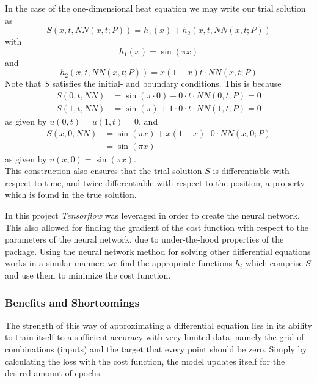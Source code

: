 \documentclass[aps,reprint,superscriptaddress,nofootinbib]{revtex4-2}
\begin{document}
In the case of the one-dimensional heat equation we may write our trial solution as
\begin{equation*}
    S(x, t, NN(x, t; P)) = h_1(x) + h_2(x, t, NN(x, t; P))
\end{equation*}
with
\begin{equation*}
    h_1(x) = \sin(\pi x)
\end{equation*}
and
\begin{equation*}
    h_2(x, t, NN(x, t; P)) = x(1-x)t \cdot NN(x, t; P)
\end{equation*}
Note that $S$ satisfies the initial- and boundary conditions. This is because
\begin{align*}
    S(0, t, NN) &= \sin(\pi \cdot 0) + 0 \cdot t\cdot NN(0, t; P) = 0 \\
    S(1, t, NN) &= \sin(\pi) + 1\cdot 0 \cdot t \cdot NN(1, t; P) = 0
\end{align*}
as given by $u(0, t) = u(1, t) = 0$, and
\begin{align*}
    S(x, 0, NN) &= \sin(\pi x) + x(1-x) \cdot 0 \cdot NN(x, 0; P) \\
    &= \sin(\pi x)
\end{align*}
as given by $u(x, 0) = \sin(\pi x)$. \\
This construction also ensures that the trial solution $S$ is differentiable with respect to time, and twice differentiable with respect to the position, a property which is found in the true solution.

In this project \textit{Tensorflow} was leveraged %
in order to create the neural network. This also allowed for finding the gradient of the cost function with respect to the parameters of the neural network, due to under-the-hood properties of the package.
Using the neural network method for solving other differential equations works in a similar manner: we find the appropriate functions \(h_i\) which comprise \(S\) and use them to minimize the cost function.%


\subsubsection{Benefits and Shortcomings}

The strength of this way of approximating a differential equation lies in its ability to train itself to a sufficient accuracy with very limited data, namely the grid of combinations (inputs) and the target that every point should be zero. Simply by calculating the loss with the cost function, the model updates itself for the desired amount of epochs.
\end{document}
